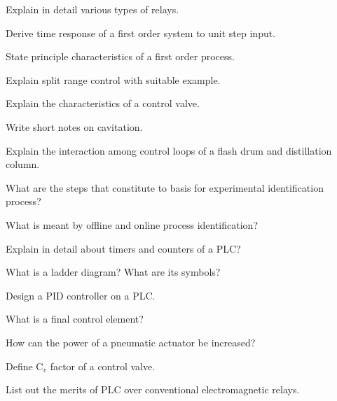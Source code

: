 \item \iitem Explain in detail various types of relays.
\Or

\newpage

\again
\item \iitem Derive time response of a first order system to unit step input. 
\item State principle characteristics of a first order process. 

\ene
\ene

\item \iitem Explain split range control with suitable example.
\Or
\item \iitem Explain the characteristics of a control valve. 
\item Write short notes on cavitation. 

\ene
\ene

\item \iitem Explain the interaction among control loops of a flash drum and
  distillation column.
\Or
\item \iitem What are the steps that constitute to basis for experimental
  identification process?
\item What is meant by offline and online process identification?

\ene
\ene


\item \iitem Explain in detail about timers and counters of a PLC?
\Or
\item \iitem What is a ladder diagram? What are its symbols? 
\item Design a PID controller on a PLC. 
\ene
\ene

\markC

\ene


\newpage




\sub{\subj}

\maxtime


\partA


\iitem What is a final control element?

\item How can the power of a pneumatic actuator be increased?

\item Define C$_v$ factor of a control valve.

\item List out the merits of PLC over conventional electromagnetic relays.


